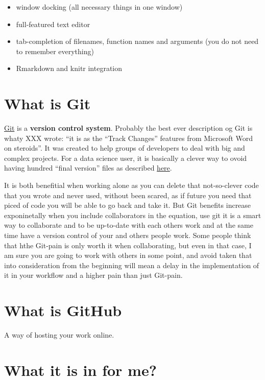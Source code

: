 \documentclass[]{book}
\providecommand{\tightlist}{%
  \setlength{\itemsep}{0pt}\setlength{\parskip}{0pt}}
\theoremstyle{definition}
\theoremstyle{definition}
\theoremstyle{definition}
\theoremstyle{remark}
\begin{document}
\begin{itemize}
\tightlist
\item
  window docking (all necessary things in one window)
\item
  full-featured text editor
\item
  tab-completion of filenames, function names and arguments (you do not
  need to remember everything)
\item
  Rmarkdown and knitr integration
\end{itemize}

\hypertarget{what-is-git}{%
\section{What is Git}\label{what-is-git}}

\href{http://git-scm.com}{Git} is a \textbf{version control system}.
Probably the best ever description og Git is whaty XXX wrote: ``it is as
the ``Track Changes'' features from Microsoft Word on steroids''. It was
created to help groups of developers to deal with big and complex
projects. For a data science user, it is basically a clever way to ovoid
having hundred ``final version'' files as described
\href{http://phdcomics.com/comics.php?f=1531}{here}.

It is both benefitial when working alone as you can delete that
not-so-clever code that you wrote and never used, without been scared,
as if future you need that piced of code you will be able to go back and
take it. But Git benefits increase exponinetally when you include
collaborators in the equation, use git it is a smart way to collaborate
and to be up-to-date with each others work and at the same time have a
version control of your and others people work. Some people think that
hthe Git-pain is only worth it when collaborating, but even in that
case, I am sure you are going to work with others in some point, and
avoid taken that into consideration from the beginning will mean a delay
in the implementation of it in your workflow and a higher pain than just
Git-pain.

\hypertarget{what-is-github}{%
\section{What is GitHub}\label{what-is-github}}

A way of hosting your work online.

\hypertarget{what-it-is-in-for-me}{%
\section{What it is in for me?}\label{what-it-is-in-for-me}}
\end{document}
